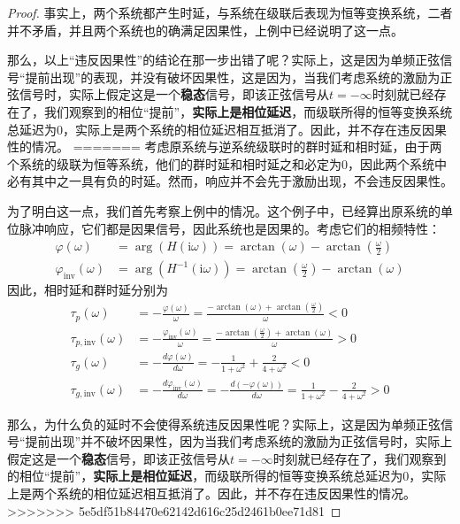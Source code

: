 \begin{proof}
事实上，两个系统都产生时延，与系统在级联后表现为恒等变换系统，二者并不矛盾，并且两个系统也的确满足因果性，上例中已经说明了这一点。

那么，以上“违反因果性”的结论在那一步出错了呢？实际上，这是因为单频正弦信号“提前出现”的表现，并没有破坏因果性，这是因为，当我们考虑系统的激励为正弦信号时，实际上假定这是一个\textbf{稳态}信号，即该正弦信号从$t=-\infty$时刻就已经存在了，我们观察到的相位“提前”，\textbf{实际上是相位延迟}，而级联所得的恒等变换系统总延迟为0，实际上是两个系统的相位延迟相互抵消了。因此，并不存在违反因果性的情况。
=======
考虑原系统与逆系统级联时的群时延和相时延，由于两个系统的级联为恒等系统，他们的群时延和相时延之和必定为0，因此两个系统中必有其中之一具有负的时延。然而，响应并不会先于激励出现，不会违反因果性。

为了明白这一点，我们首先考察上例中的情况。这个例子中，已经算出原系统的单位脉冲响应，它们都是因果信号，因此系统也是因果的。考虑它们的相频特性：
\begin{align*}
    \varphi(\omega)&=\arg(H(\mathrm{i}\omega))=\arctan(\omega)-\arctan\left(\frac{\omega}{2}\right)\\
    \varphi_{\text{inv}}(\omega)&=\arg(H^{-1}(\mathrm{i}\omega))=\arctan\left(\frac{\omega}{2}\right)-\arctan(\omega)
\end{align*}
因此，相时延和群时延分别为
\begin{align*}
    \tau_p(\omega)&=-\frac{\varphi(\omega)}{\omega}=\frac{-\arctan(\omega)+\arctan\left(\frac{\omega}{2}\right)}{\omega}<0\\
    \tau_{p,\text{inv}}(\omega)&=-\frac{\varphi_{\text{inv}}(\omega)}{\omega}=\frac{-\arctan\left(\frac{\omega}{2}\right)+\arctan(\omega)}{\omega}>0\\
    \tau_g(\omega)&=-\frac{d\varphi(\omega)}{d\omega}=-\frac{1}{1+\omega^2}+\frac{2}{4+\omega^2}<0\\
    \tau_{g,\text{inv}}(\omega)&=-\frac{d\varphi_{\text{inv}}(\omega)}{d\omega}=-\frac{d(-\varphi(\omega))}{d\omega}=\frac{1}{1+\omega^2}-\frac{2}{4+\omega^2}>0
\end{align*}

那么，为什么负的延时不会使得系统违反因果性呢？实际上，这是因为单频正弦信号“提前出现”并不破坏因果性，因为当我们考虑系统的激励为正弦信号时，实际上假定这是一个\textbf{稳态}信号，即该正弦信号从$t=-\infty$时刻就已经存在了，我们观察到的相位“提前”，\textbf{实际上是相位延迟}，而级联所得的恒等变换系统总延迟为0，实际上是两个系统的相位延迟相互抵消了。因此，并不存在违反因果性的情况。
>>>>>>> 5e5df51b84470e62142d616c25d2461b0ee71d81


\end{proof}
